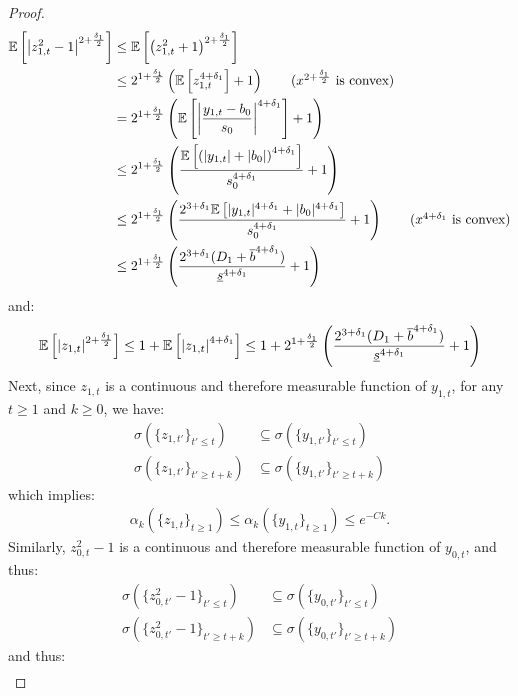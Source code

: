 \begin{proof}
\begin{align*}
    \E\left[\left|z^2_{1,t} -1 \right|^{2+\frac{\delta_1}{2}}\right] &\leq \E\left[\left(z_{1,t}^2 + 1\right)^{2+\frac{\delta_1}{2}}\right]\\
    &\leq 2^{1+\frac{\delta_1}{2}}\left(\E\left[z_{1,t}^{4+\delta_1} \right]+ 1\right) \tag{$x^{2+\frac{\delta_1}{2}}$ is convex} \\
    &= 2^{1+\frac{\delta_1}{2}}\left(\E\left[\left|\frac{y_{1,t} - b_0}{s_0}\right|^{4+\delta_1}\right] + 1\right) \\
    &\leq 2^{1+\frac{\delta_1}{2}}\left(\frac{\E\left[\left(|y_{1,t}| + |b_0| \right)^{4+\delta_1}\right]}{s_0^{4+\delta_1}}+ 1\right)  \\
    &\leq 2^{1+\frac{\delta_1}{2}}\left(\frac{2^{3+\delta_1}\E\left[|y_{1,t}|^{4+\delta_1} + |b_0|^{4+\delta_1}\right]}{s_0^{4+\delta_1}} + 1\right) \tag{$x^{4+\delta_1}$ is convex} \\
    &\leq 2^{1+\frac{\delta_1}{2}}\left(\frac{2^{3+\delta_1}(D_1 + \overline{b}^{4+\delta_1})}{\underline{s}^{4+\delta_1}} + 1 \right)
\end{align*}
and:
\begin{align*}
    \mathbb{E}\left[\left|z_{1,t}\right|^{2 + \frac{\delta_1}{2}}\right] \leq 1 + \mathbb{E}\left[\left|z_{1,t}\right|^{4 + \delta_1}\right] \leq 1+2^{1+\frac{\delta_1}{2}}\left(\frac{2^{3+\delta_1}(D_1 + \overline{b}^{4+\delta_1})}{\underline{s}^{4+\delta_1}} + 1 \right)
\end{align*}
Next, since $z_{1,t}$ is a continuous and therefore measurable function of $y_{1,t}$, for any $t \geq 1$ and $k \geq 0$, we have:
\begin{align*}
    \sigma(\{z_{1,t'}\}_{t'\leq t}) &\subseteq \sigma(\{y_{1,t'}\}_{t'\leq t}) \\
    \sigma(\{z_{1,t'}\}_{t'\geq t+k}) &\subseteq \sigma(\{y_{1,t'}\}_{t'\geq t+k})
\end{align*}
which implies:
\begin{align*}
    \alpha_k(\{z_{1,t}\}_{t\geq 1}) \leq \alpha_k(\{y_{1,t}\}_{t\geq 1}) \leq e^{-Ck}.
\end{align*}
Similarly, $z^2_{0,t} - 1$ is a continuous and therefore measurable function of $y_{0,t}$, and thus:
\begin{align*}
    \sigma(\{z^2_{0,t'} - 1\}_{t'\leq t}) &\subseteq \sigma(\{y_{0,t'}\}_{t'\leq t}) \\
    \sigma(\{z^2_{0,t'} - 1\}_{t'\geq t+k}) &\subseteq \sigma(\{y_{0,t'}\}_{t'\geq t+k})
\end{align*}
and thus:
\begin{align*}

\end{align*}
\end{proof}
